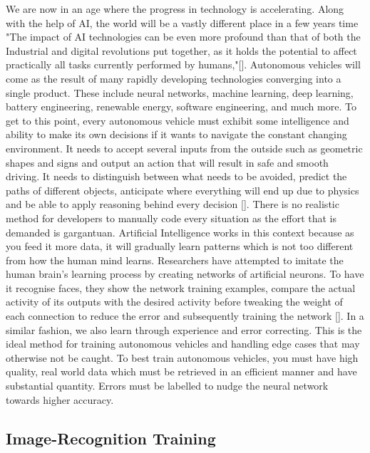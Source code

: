 \documentclass{article}
\begin{document}
We are now in an age where the progress in technology is accelerating. Along with the help of AI, the world will be a vastly different place in a few years time "The impact of AI technologies can be even more profound than that of both the Industrial and digital revolutions put together, as it holds the potential to affect practically all tasks currently performed by humans,"[\textcite{makridakis2017forthcoming}]. Autonomous vehicles will come as the result of many rapidly developing technologies converging into a single product. These include neural networks, machine learning, deep learning, battery engineering, renewable energy, software engineering, and much more. 
\bigbreak
To get to this point, every autonomous vehicle must exhibit some intelligence and ability to make its own decisions if it wants to navigate the constant changing environment. It needs to accept several inputs from the outside such as geometric shapes and signs and output an action that will result in safe and smooth driving. It needs to distinguish between what needs to be avoided, predict the paths of different objects, anticipate where everything will end up due to physics and be able to apply reasoning behind every decision [\textcite{pomerol1997artificial}]. There is no realistic method for developers to manually code every situation as the effort that is demanded is gargantuan.  
\bigbreak
Artificial Intelligence works in this context because as you feed it more data, it will gradually learn patterns which is not too different from how the human mind learns. Researchers have attempted to imitate the human brain's learning process by creating networks of artificial neurons. To have it recognise faces, they show the network training examples, compare the actual activity of its outputs with the desired activity before tweaking the weight of each connection to reduce the error and subsequently training the network [\textcite{hinton1992neural}]. In a similar fashion, we also learn through experience and error correcting. This is the ideal method for training autonomous vehicles and handling edge cases that may otherwise not be caught. To best train autonomous vehicles, you must have high quality, real world data which must be retrieved in an efficient manner and have substantial quantity. Errors must be labelled to nudge the neural network towards higher accuracy.

\subsection{Image-Recognition Training}
\end{document}
